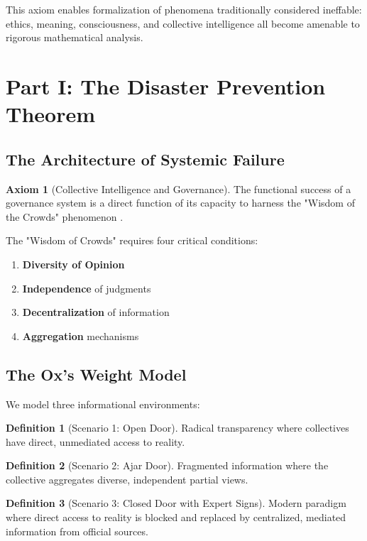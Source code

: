 \documentclass[11pt,a4paper]{article}
\theoremstyle{definition}
\newtheorem{definition}{Definition}[section]
\newtheorem{axiom}{Axiom}[section]
\theoremstyle{remark}
\begin{document}
This axiom enables formalization of phenomena traditionally considered ineffable: ethics, meaning, consciousness, and collective intelligence all become amenable to rigorous mathematical analysis.

\section{Part I: The Disaster Prevention Theorem}

\subsection{The Architecture of Systemic Failure}

\begin{axiom}[Collective Intelligence and Governance]
The functional success of a governance system is a direct function of its capacity to harness the "Wisdom of the Crowds" phenomenon \citep{surowiecki2004wisdom}.
\end{axiom}

The "Wisdom of Crowds" requires four critical conditions:
\begin{enumerate}
\item \textbf{Diversity of Opinion}
\item \textbf{Independence} of judgments
\item \textbf{Decentralization} of information
\item \textbf{Aggregation} mechanisms
\end{enumerate}

\subsection{The Ox's Weight Model}

We model three informational environments:

\begin{definition}[Scenario 1: Open Door]
Radical transparency where collectives have direct, unmediated access to reality.
\end{definition}

\begin{definition}[Scenario 2: Ajar Door]
Fragmented information where the collective aggregates diverse, independent partial views.
\end{definition}

\begin{definition}[Scenario 3: Closed Door with Expert Signs]
Modern paradigm where direct access to reality is blocked and replaced by centralized, mediated information from official sources.
\end{definition}
\end{document}
